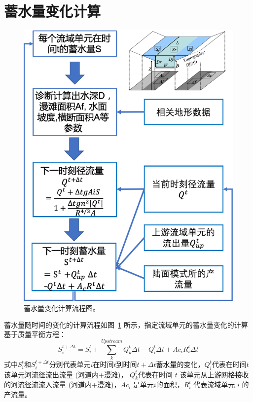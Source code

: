 \section{蓄水量变化计算}
{
\begin{figure}[htbp]
\centering
\includegraphics{Figures/陆地表面的水分循环/蓄水量变化计算流程图.png}
\caption{蓄水量变化计算流程图。 }
\label{fig:蓄水量变化计算流程图}
\end{figure}
}
蓄水量随时间的变化的计算流程如图~\ref{fig:蓄水量变化计算流程图} 所示，指定流域单元的蓄水量变化的计算基于质量平衡方程：
\begin{equation}
S_{i}^{t+\Delta t}=S_{i}^{t}+\sum_{k}^{Upstream} Q_{k}^{t} \Delta t-Q_{i}^{t} \Delta t+A c_{i} R_{i}^{t} \Delta t
\end{equation}
式中$S_{i}^{t}$和$S_{i}^{t+\Delta t}$分别代表单元$i$在时间$t$到时间$t+\Delta t$蓄水量的变化，$Q_i^t$代表在时间$t$该单元河流径流出流量 (河道内+漫滩)，
$Q_k^t$代表在时间 $t$ 该单元从上游网格接收的河流径流流入流量 (河道内+漫滩)，$Ac_i$ 是单元$i$的面积，$R_i^t$ 代表流域单元 $i$ 的产流量。


